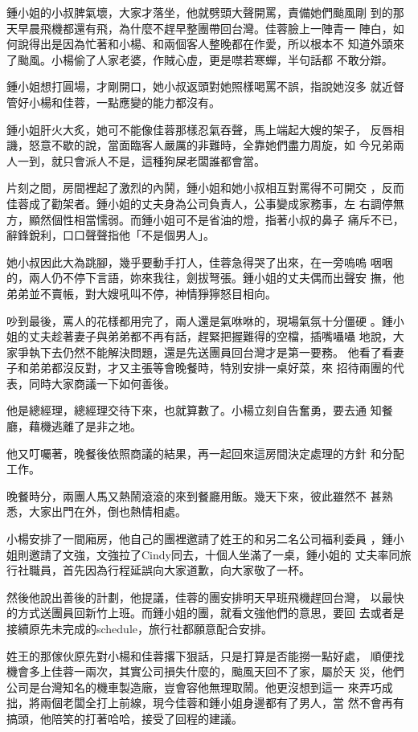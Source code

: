 鍾小姐的小叔脾氣壞，大家才落坐，他就劈頭大聲開罵，責備她們颱風剛
到的那天早晨飛機都還有飛，為什麼不趕早整團帶回台灣。佳蓉臉上一陣青一
陣白，如何說得出是因為忙著和小楊、和兩個客人整晚都在作愛，所以根本不
知道外頭來了颱風。小楊偷了人家老婆，作賊心虛，更是噤若寒蟬，半句話都
不敢分辯。

鍾小姐想打圓場，才剛開口，她小叔返頭對她照樣喝罵不誤，指說她沒多
就近督管好小楊和佳蓉，一點應變的能力都沒有。

鍾小姐肝火大炙，她可不能像佳蓉那樣忍氣吞聲，馬上端起大嫂的架子，
反唇相譏，怒意不歇的說，當面臨客人嚴厲的非難時，全靠她們盡力周旋，如
今兄弟兩人一到，就只會派人不是，這種狗屎老闆誰都會當。

片刻之間，房間裡起了激烈的內鬨，鍾小姐和她小叔相互對罵得不可開交
，反而佳蓉成了勸架者。鍾小姐的丈夫身為公司負責人，公事變成家務事，左
右調停無方，顯然個性相當懦弱。而鍾小姐可不是省油的燈，指著小叔的鼻子
痛斥不已，辭鋒銳利，口口聲聲指他「不是個男人」。

她小叔因此大為跳腳，幾乎要動手打人，佳蓉急得哭了出來，在一旁嗚嗚
咽咽的，兩人仍不停下言語，妳來我往，劍拔弩張。鍾小姐的丈夫偶而出聲安
撫，他弟弟並不賣帳，對大嫂吼叫不停，神情猙獰怒目相向。

吵到最後，罵人的花樣都用完了，兩人還是氣咻咻的，現場氣氛十分僵硬
。鍾小姐的丈夫趁著妻子與弟弟都不再有話，趕緊把握難得的空檔，插嘴囁囁
地說，大家爭執下去仍然不能解決問題，還是先送團員回台灣才是第一要務。
他看了看妻子和弟弟都沒反對，才又主張等會晚餐時，特別安排一桌好菜，來
招待兩團的代表，同時大家商議一下如何善後。

他是總經理，總經理交待下來，也就算數了。小楊立刻自告奮勇，要去通
知餐廳，藉機逃離了是非之地。

他又叮囑著，晚餐後依照商議的結果，再一起回來這房間決定處理的方針
和分配工作。

晚餐時分，兩團人馬又熱鬧滾滾的來到餐廳用飯。幾天下來，彼此雖然不
甚熟悉，大家出門在外，倒也熱情相處。

小楊安排了一間廂房，他自己的團裡邀請了姓王的和另二名公司福利委員
，鍾小姐則邀請了文強，文強拉了Cindy同去，十個人坐滿了一桌，鍾小姐的
丈夫率同旅行社職員，首先因為行程延誤向大家道歉，向大家敬了一杯。

然後他說出善後的計劃，他提議，佳蓉的團安排明天早班飛機趕回台灣，
以最快的方式送團員回新竹上班。而鍾小姐的團，就看文強他們的意思，要回
去或者是接續原先未完成的schedule，旅行社都願意配合安排。

姓王的那傢伙原先對小楊和佳蓉撂下狠話，只是打算是否能撈一點好處，
順便找機會多上佳蓉一兩次，其實公司損失什麼的，颱風天回不了家，屬於天
災，他們公司是台灣知名的機車製造廠，豈會容他無理取鬧。他更沒想到這一
來弄巧成拙，將兩個老闆全打上前線，現今佳蓉和鍾小姐身邊都有了男人，當
然不會再有搞頭，他陪笑的打著哈哈，接受了回程的建議。


